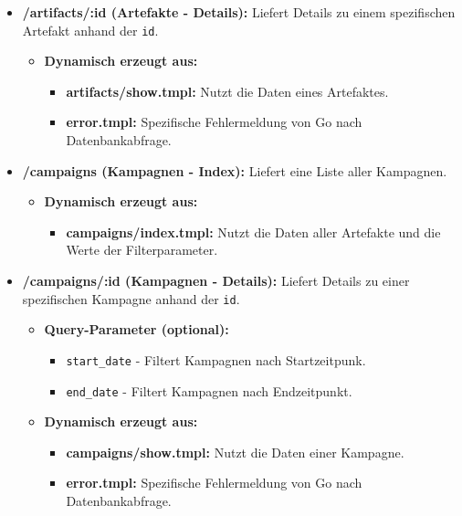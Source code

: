 \begin{itemize}
    \item \textbf{/artifacts/:id (Artefakte - Details):} Liefert Details zu einem spezifischen Artefakt anhand der \texttt{id}.
          \begin{itemize}
              \item \textbf{Dynamisch erzeugt aus:}
                    \begin{itemize}
                        \item \textbf{artifacts/show.tmpl:} Nutzt die Daten eines Artefaktes.
                        \item \textbf{error.tmpl:} Spezifische Fehlermeldung von Go nach Datenbankabfrage.
                    \end{itemize}

          \end{itemize}

    \item \textbf{/campaigns (Kampagnen - Index):} Liefert eine Liste aller Kampagnen.
          \begin{itemize}
              \item \textbf{Dynamisch erzeugt aus:}
                    \begin{itemize}
                        \item \textbf{campaigns/index.tmpl:} Nutzt die Daten aller Artefakte und die Werte der Filterparameter.
                    \end{itemize}
          \end{itemize}

    \item \textbf{/campaigns/:id (Kampagnen - Details):} Liefert Details zu einer spezifischen Kampagne anhand der \texttt{id}.
    \begin{itemize}
    \item \textbf{Query-Parameter (optional):}
          \begin{itemize}
              \item \texttt{start\_date} - Filtert Kampagnen nach Startzeitpunk.
              \item \texttt{end\_date} - Filtert Kampagnen nach Endzeitpunkt.
          \end{itemize}
    \item \textbf{Dynamisch erzeugt aus:}
            \begin{itemize}
                \item \textbf{campaigns/show.tmpl:} Nutzt die Daten einer Kampagne.
                \item \textbf{error.tmpl:} Spezifische Fehlermeldung von Go nach Datenbankabfrage.
            \end{itemize}
    \end{itemize}
\end{itemize}

